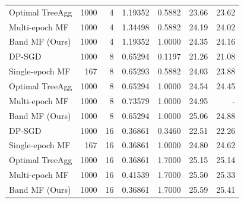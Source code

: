 \begin{tabular}{lrrrrrr}
 Optimal TreeAgg &           1000 &          4 &          1.19352 &             0.5882 &                             23.66 &             23.62 \\
  Multi-epoch MF &           1000 &          4 &          1.34498 &             0.5882 &                             24.19 &             24.02 \\
  Band MF (Ours) &           1000 &          4 &          1.19352 &             1.0000 &                             24.35 &             24.16 \\
\midrule  
          DP-SGD &           1000 &          8 &          0.65294 &             0.1197 &                             21.26 &             21.08 \\
 Single-epoch MF &            167 &          8 &          0.65293 &             0.5882 &                             24.03 &             23.88 \\
 Optimal TreeAgg &           1000 &          8 &          0.65294 &             1.0000 &                             24.54 &             24.45 \\
  Multi-epoch MF &           1000 &          8 &          0.73579 &             1.0000 &                             24.95 &               - \\
  Band MF (Ours) &           1000 &          8 &          0.65294 &             1.0000 &                             25.06 &             24.88 \\
\midrule  
          DP-SGD &           1000 &         16 &          0.36861 &             0.3460 &                             22.51 &             22.26 \\
 Single-epoch MF &            167 &         16 &          0.36861 &             1.0000 &                             24.80 &             24.62 \\
 Optimal TreeAgg &           1000 &         16 &          0.36861 &             1.7000 &                             25.15 &             25.14 \\
  Multi-epoch MF &           1000 &         16 &          0.41539 &             1.7000 &                             25.50 &             25.33 \\
  Band MF (Ours) &           1000 &         16 &          0.36861 &             1.7000 &                             25.59 &             25.41 \\
\bottomrule
\end{tabular}